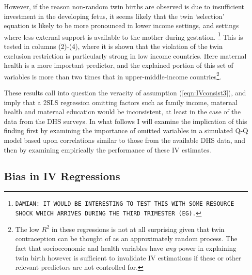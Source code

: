 \documentclass{article}[11pt,subeqn]
\begin{document}
\begin{spacing}{1.5}
However, if the reason non-random twin births are observed is due to insufficient investment in the developing fetus, it seems likely that
the twin `selection' equation is likely to be more pronounced in lower income settings, and settings where less external support is available
to the mother during gestation. \footnote{\texttt{DAMIAN: IT WOULD BE INTERESTING TO TEST THIS WITH SOME RESOURCE SHOCK WHICH ARRIVES DURING
THE THIRD TRIMESTER (EG).}}  This is tested in columns (2)-(4), where it is shown that the violation of the twin exclusion restriction is particularly
strong in low income countries.  Here maternal health is a more important predictor, and the explained portion of this set of variables is more than
two times that in upper-middle-income countries\footnote{The low $R^2$ in these regressions is not at all surprising given that twin contraception
can be thought of as an approximately random process.  The fact that socioeconomic and health variables have \emph{any} power in explaining
twin birth however is sufficient to invalidate IV estimations if these or other relevant predictors are not controlled for.}.

These results call into question the veracity of assumption (\ref{eqn:IVconsist3}), and imply that a 2SLS regression omitting factors such as family
income, maternal health and maternal education would be inconsistent, at least in the case of the data from the DHS surveys.  In what follows
I will examine the implication of this finding first by examining the importance of omitted variables in a simulated Q-Q model based upon
correlations similar to those from the available DHS data, and then by examining empirically the performance of these IV estimates.  
\subsection{Bias in IV Regressions}
\label{scn:bias}

\end{spacing}
\end{document}
